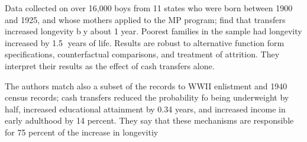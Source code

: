 \documentclass[12pt]{article}
\begin{document}
Data collected on over 16,000 boys from 11 states who were born between 1900 and 1925, and whose mothers applied to the MP program; find that transfers increased longevity by about 1 year.  Poorest families in the sample had longevity increased by 1.5 years of life.  Results are robust to alternative function form specifications, counterfactual comparisons, and treatment of attrition.  They interpret their results as the effect of cash transfers alone.  

The authors match also a subset of the records to WWII enlistment and 1940 census records; cash transfers reduced the probability fo being underweight by half, increased educational attainment by 0.34 years, and increased income in early adulthood by 14 percent.  They say that these mechanisms are responsible for 75 percent of the increase in longevitiy
\end{document}
